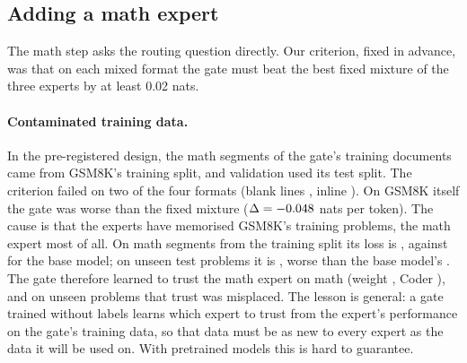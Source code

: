\documentclass[10pt]{article}
\begin{document}
\subsection{Adding a math expert}
\label{sec:pretrained_math}

The math step asks the routing question directly. Our criterion, fixed in advance, was that on
each mixed format the gate must beat the best fixed mixture of the three experts by at least
0.02 nats.

\paragraph{Contaminated training data.} In the pre-registered design, the math segments of the
gate's training documents came from GSM8K's training split, and validation used its test
split. The criterion failed on two of the four formats (blank lines \resTrackBContMarginBlank,
inline \resTrackBContMarginInline). On GSM8K itself the gate was worse than the fixed mixture
($\Delta = -0.048$ nats per token). The cause is that the experts have memorised
GSM8K's training problems, the math expert most of all. On math segments from the training
split its loss is \resTrackBSegTrainSplitMath{}, against \resTrackBSegTrainSplitBase{} for the
base model; on unseen test problems it is \resTrackBSegTestSplitMath{}, worse than the base
model's \resTrackBSegTestSplitBase{}. The gate therefore learned to trust the math expert on
math (weight \resTrackBContWeightMathOnMath{}, Coder \resTrackBContWeightCoderOnMath{}), and on
unseen problems that trust was misplaced. The lesson is general: a gate trained without labels
learns which expert to trust from the expert's performance on the gate's training data, so
that data must be as new to every expert as the data it will be used on. With pretrained
models this is hard to guarantee.
\end{document}
